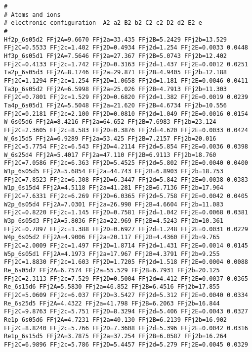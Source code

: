 {\begin{verbatim}
#
# Atoms and ions
# electronic configuration  A2 a2 B2 b2 C2 c2 D2 d2 E2 e
#
Hf2p_6s05d2 FFj2A=9.6670 FFj2a=33.435 FFj2B=5.2429 FFj2b=13.529 FFj2C=0.5533 FFj2c=1.402 FFj2D=0.4934 FFj2d=1.254 FFj2E=0.0033 0.0448 
Hf3p_6s05d1 FFj2A=7.5646 FFj2a=27.367 FFj2B=5.0743 FFj2b=12.402 FFj2C=0.4133 FFj2c=1.742 FFj2D=0.3163 FFj2d=1.437 FFj2E=0.0012 0.0251 
Ta2p_6s05d3 FFj2A=8.1746 FFj2a=29.871 FFj2B=4.9405 FFj2b=12.188 FFj2C=1.1294 FFj2c=1.254 FFj2D=1.0658 FFj2d=1.181 FFj2E=0.0046 0.0411 
Ta3p_6s05d2 FFj2A=6.5998 FFj2a=25.026 FFj2B=4.7913 FFj2b=11.303 FFj2C=0.7801 FFj2c=1.529 FFj2D=0.6820 FFj2d=1.382 FFj2E=0.0019 0.0239 
Ta4p_6s05d1 FFj2A=5.5048 FFj2a=21.620 FFj2B=4.6734 FFj2b=10.556 FFj2C=0.2181 FFj2c=2.100 FFj2D=0.0810 FFj2d=1.049 FFj2E=0.0016 0.0154 
W_6s05d6 FFj2A=8.4216 FFj2a=64.652 FFj2B=7.6983 FFj2b=23.124 FFj2C=2.3605 FFj2c=8.583 FFj2D=0.3876 FFj2d=4.620 FFj2E=0.0033 0.0424 
W_6s15d5 FFj2A=6.9289 FFj2a=53.425 FFj2B=7.2157 FFj2b=20.016 FFj2C=5.7754 FFj2c=6.543 FFj2D=4.2114 FFj2d=5.854 FFj2E=0.0036 0.0398 
W_6s25d4 FFj2A=5.4017 FFj2a=47.110 FFj2B=6.9113 FFj2b=18.760 FFj2C=7.0586 FFj2c=6.363 FFj2D=5.4525 FFj2d=5.802 FFj2E=0.0040 0.0400 
W1p_6s05d5 FFj2A=5.6854 FFj2a=44.743 FFj2B=6.8903 FFj2b=18.753 FFj2C=7.8523 FFj2c=6.308 FFj2D=6.3447 FFj2d=5.842 FFj2E=0.0038 0.0383 
W1p_6s15d4 FFj2A=4.5118 FFj2a=41.281 FFj2B=6.7136 FFj2b=17.964 FFj2C=7.6331 FFj2c=6.269 FFj2D=6.0365 FFj2d=5.758 FFj2E=0.0042 0.0405 
W2p_6s05d4 FFj2A=7.0301 FFj2a=26.990 FFj2B=4.6604 FFj2b=11.083 FFj2C=0.8220 FFj2c=1.145 FFj2D=0.7581 FFj2d=1.042 FFj2E=0.0068 0.0381 
W3p_6s05d3 FFj2A=5.8036 FFj2a=22.969 FFj2B=4.5243 FFj2b=10.361 FFj2C=0.7897 FFj2c=1.388 FFj2D=0.6927 FFj2d=1.248 FFj2E=0.0031 0.0229 
W4p_6s05d2 FFj2A=4.9006 FFj2a=20.117 FFj2B=4.4360 FFj2b=9.765 FFj2C=2.0009 FFj2c=1.497 FFj2D=1.8714 FFj2d=1.431 FFj2E=0.0014 0.0145 
W5p_6s05d1 FFj2A=4.1973 FFj2a=17.967 FFj2B=4.3791 FFj2b=9.255 FFj2C=1.8830 FFj2c=1.603 FFj2D=1.7205 FFj2d=1.518 FFj2E=0.0004 0.0088 
Re_6s05d7 FFj2A=6.7574 FFj2a=55.529 FFj2B=6.7931 FFj2b=20.125 FFj2C=2.3113 FFj2c=7.529 FFj2D=0.5004 FFj2d=4.412 FFj2E=0.0037 0.0365 
Re_6s15d6 FFj2A=5.5830 FFj2a=46.852 FFj2B=6.4516 FFj2b=17.855 FFj2C=5.0609 FFj2c=6.037 FFj2D=3.5427 FFj2d=5.312 FFj2E=0.0040 0.0334 
Re_6s25d5 FFj2A=4.4322 FFj2a=41.798 FFj2B=6.2063 FFj2b=16.844 FFj2C=9.8763 FFj2c=5.751 FFj2D=8.3294 FFj2d=5.406 FFj2E=0.0043 0.0327 
Re1p_6s05d6 FFj2A=4.7231 FFj2a=40.130 FFj2B=6.2139 FFj2b=16.902 FFj2C=8.8240 FFj2c=5.766 FFj2D=7.3608 FFj2d=5.396 FFj2E=0.0042 0.0316 
Re1p_6s15d5 FFj2A=3.7875 FFj2a=37.254 FFj2B=6.0587 FFj2b=16.264 FFj2C=6.9896 FFj2c=5.786 FFj2D=5.4457 FFj2d=5.279 FFj2E=0.0045 0.0329 

\end{verbatim}}
